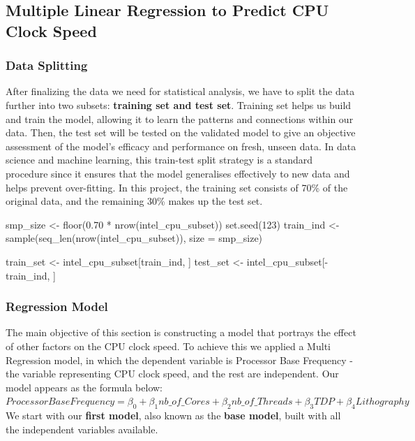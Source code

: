 \subsection{Multiple Linear Regression to Predict CPU Clock Speed}

\subsubsection{Data Splitting}
After finalizing the data we need for statistical analysis, we have to split the data further into two subsets: \textbf{training set and test set}. Training set helps us build and train the model, allowing it to learn the patterns and connections within our data. Then, the test set will be tested on the validated model to give an objective assessment of the model's efficacy and performance on fresh, unseen data. In data science and machine learning, this train-test split strategy is a standard procedure since it ensures that the model generalises effectively to new data and helps prevent over-fitting. In this project, the training set consists of 70\% of the original data, and the remaining 30\% makes up the test set.

smp_size <- floor(0.70 * nrow(intel_cpu_subset))
set.seed(123)
train_ind <- sample(seq_len(nrow(intel_cpu_subset)), size = smp_size)

train_set <- intel_cpu_subset[train_ind, ]
test_set <- intel_cpu_subset[-train_ind, ]

\subsubsection{Regression Model}
The main objective of this section is constructing a model that portrays the effect of other factors on the CPU clock speed. To achieve this we applied a Multi Regression model, in which the dependent variable is Processor Base Frequency - the variable representing CPU clock speed, and the rest are independent. Our model appears as the formula below:\\

$Processor Base Frequency = \beta_0 + \beta_1 nb\_of\_Cores + \beta_2 nb\_of\_Threads + \beta_3 TDP + \beta_4 Lithography$ \\

We start with our \textbf{first model}, also known as the \textbf{base model}, built with all the independent variables available. \\

